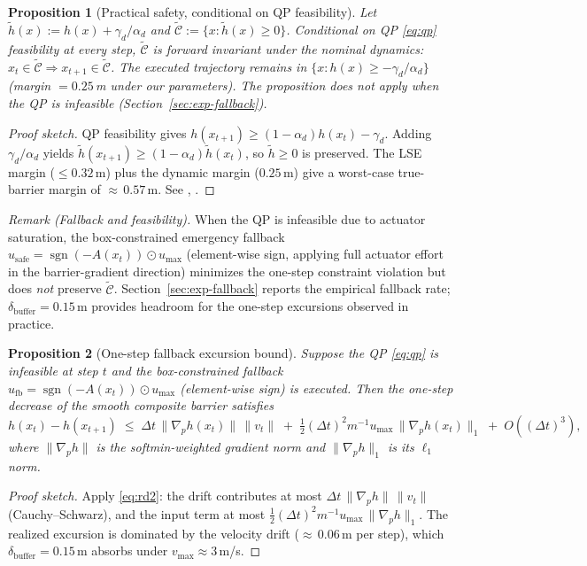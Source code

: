 \documentclass[11pt,onecolumn,a4paper]{article}
\newtheorem{proposition}{Proposition}
\newcommand{\safe}{\mathrm{safe}}
\begin{document}
\begin{proposition}[Practical safety, conditional on QP feasibility]
\label{prop:safety}
Let $\tilde h(x) := h(x) + \gamma_d/\alpha_d$ and
$\tilde{\mathcal C} := \{x : \tilde h(x) \ge 0\}$.
\emph{Conditional on QP \eqref{eq:qp} feasibility at every step,}
$\tilde{\mathcal C}$ is forward invariant under the nominal dynamics:
$x_t \in \tilde{\mathcal C} \Rightarrow x_{t+1} \in \tilde{\mathcal C}$.
The executed trajectory remains in $\{x : h(x) \ge -\gamma_d/\alpha_d\}$
(margin $= 0.25\,$m under our parameters).
The proposition does \emph{not} apply when the QP is infeasible
(Section~\ref{sec:exp-fallback}).
\end{proposition}
\begin{proof}[Proof sketch]
QP feasibility gives $h(x_{t+1}) \ge (1 - \alpha_d) h(x_t) - \gamma_d$.
Adding $\gamma_d/\alpha_d$ yields $\tilde h(x_{t+1}) \ge
(1 - \alpha_d) \tilde h(x_t)$, so $\tilde h \ge 0$ is preserved.
The LSE margin ($\le 0.32\,$m) plus the dynamic margin ($0.25\,$m)
give a worst-case true-barrier margin of ${\approx}\,0.57\,$m.
See \cite[Thm.~1]{WAN17}, \cite[\S IV]{AME17}.
\end{proof}

\emph{Remark (Fallback and feasibility).}
When the QP is infeasible due to actuator saturation, the
box-constrained emergency fallback
$u_\safe = \operatorname{sgn}(-A(x_t)) \odot u_{\max}$ (element-wise
sign, applying full actuator effort in the barrier-gradient direction)
minimizes
the one-step constraint violation but does \emph{not} preserve
$\tilde{\mathcal{C}}$. Section~\ref{sec:exp-fallback} reports the
empirical fallback rate; $\delta_{\mathrm{buffer}} = 0.15\,$m provides
headroom for the one-step excursions observed in practice.

\begin{proposition}[One-step fallback excursion
bound]\label{prop:fallback}
Suppose the QP \eqref{eq:qp} is infeasible at step $t$ and the
box-constrained fallback
$u_{\mathrm{fb}} = \operatorname{sgn}(-A(x_t)) \odot u_{\max}$ (element-wise
sign) is
executed. Then the one-step decrease of the smooth composite barrier
satisfies
\begin{equation}\label{eq:fbbound}
h(x_t) - h(x_{t+1}) \;\le\;
\Delta t\, \|\nabla_p h(x_t)\|\, \|v_t\| \;+\;
\tfrac{1}{2}(\Delta t)^2 m^{-1} u_{\max}\, \|\nabla_p h(x_t)\|_1
\;+\; O((\Delta t)^3),
\end{equation}
where $\|\nabla_p h\|$ is the softmin-weighted gradient norm and
$\|\nabla_p h\|_1$ is its $\ell_1$ norm.
\end{proposition}
\begin{proof}[Proof sketch]
Apply \eqref{eq:rd2}: the drift contributes at most $\Delta t\,
\|\nabla_p h\|\, \|v_t\|$ (Cauchy--Schwarz), and the input term at most
$\tfrac{1}{2}(\Delta t)^2 m^{-1} u_{\max}\, \|\nabla_p h\|_1$. The
realized excursion is dominated by the velocity drift (${\approx}\,0.06\,$m
per step), which $\delta_{\mathrm{buffer}} = 0.15\,$m absorbs under
$v_{\max} \approx 3\,$m/s.
\end{proof}
\end{document}
